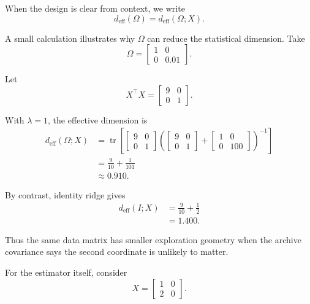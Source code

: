 \documentclass{article} %
\begin{document}
When the design is clear from context, we write
\begin{equation}
\label{eq:hyper-deff-short}
d_{\mathrm{eff}}(\Omega)=d_{\mathrm{eff}}(\Omega;X).
\end{equation}

A small calculation illustrates why \(\Omega\) can reduce the statistical dimension.  Take
\begin{equation}
\label{eq:hyper-example-omega}
\Omega=
\begin{bmatrix}
1&0\\
0&0.01
\end{bmatrix}.
\end{equation}

Let
\begin{equation}
\label{eq:hyper-example-xtx}
X^\top X=
\begin{bmatrix}
9&0\\
0&1
\end{bmatrix}.
\end{equation}

With \(\lambda=1\), the effective dimension is
\begin{align}
\label{eq:hyper-example-deff-app}
d_{\mathrm{eff}}(\Omega;X)
&=
\operatorname{tr}
\left[
\begin{bmatrix}
9&0\\
0&1
\end{bmatrix}
\left(
\begin{bmatrix}
9&0\\
0&1
\end{bmatrix}
+
\begin{bmatrix}
1&0\\
0&100
\end{bmatrix}
\right)^{-1}
\right]
\\
&=
\frac{9}{10}+\frac{1}{101}
\\
&\approx
0.910 .
\end{align}

By contrast, identity ridge gives
\begin{align}
\label{eq:hyper-example-identity}
d_{\mathrm{eff}}(I;X)
&=
\frac{9}{10}+\frac{1}{2}
\\
&=
1.400 .
\end{align}

Thus the same data matrix has smaller exploration geometry when the archive covariance says the second coordinate is unlikely to matter.

For the estimator itself, consider
\begin{equation}
\label{eq:hyper-example-X}
X=
\begin{bmatrix}
1&0\\
2&0
\end{bmatrix}.
\end{equation}
\end{document}
